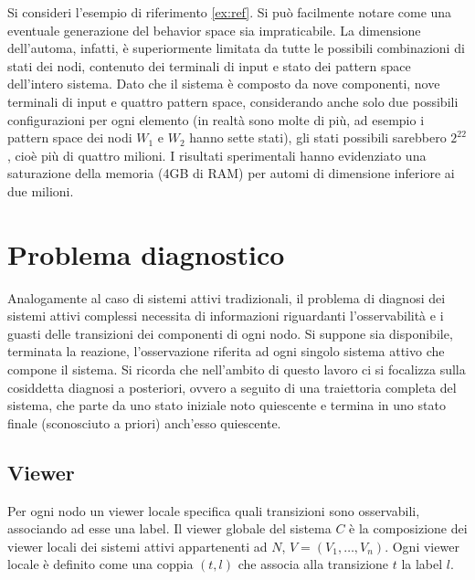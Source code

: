 \begin{ex}
Si consideri l'esempio di riferimento \ref{ex:ref}. Si può facilmente notare come una eventuale generazione del behavior space sia impraticabile. La dimensione dell'automa, infatti, è superiormente limitata da tutte le possibili combinazioni di stati dei nodi, contenuto dei terminali di input e stato dei pattern space dell'intero sistema. Dato che il sistema è composto da nove componenti, nove terminali di input e quattro pattern space, considerando anche solo due possibili configurazioni per ogni elemento (in realtà sono molte di più, ad esempio i pattern space dei nodi $W_1$ e $W_2$ hanno sette stati), gli stati possibili sarebbero $2^{22}$, cioè più di quattro milioni. I risultati sperimentali hanno evidenziato una saturazione della memoria (4GB di RAM) per automi di dimensione inferiore ai due milioni.
\end{ex}


\newpage
\section{Problema diagnostico}
Analogamente al caso di sistemi attivi tradizionali, il problema di diagnosi dei sistemi attivi complessi necessita di informazioni riguardanti l'osservabilità e i guasti delle transizioni dei componenti di ogni nodo. Si suppone sia disponibile, terminata la reazione, l'osservazione riferita ad ogni singolo sistema attivo che compone il sistema. Si ricorda che nell'ambito di questo lavoro ci si focalizza sulla cosiddetta diagnosi a posteriori, ovvero a seguito di una traiettoria completa del sistema, che parte da uno stato iniziale noto quiescente e termina in uno stato finale (sconosciuto a priori) anch'esso quiescente. 

\subsection{Viewer}
Per ogni nodo un viewer locale specifica quali transizioni sono osservabili, associando ad esse una label. Il viewer globale del sistema $C$ è la composizione dei viewer locali dei sistemi attivi appartenenti ad $N$, $V = (V_1, \ldots, V_n)$. Ogni viewer locale è definito come una coppia $(t,l)$ che associa alla transizione $t$ la label $l$.

